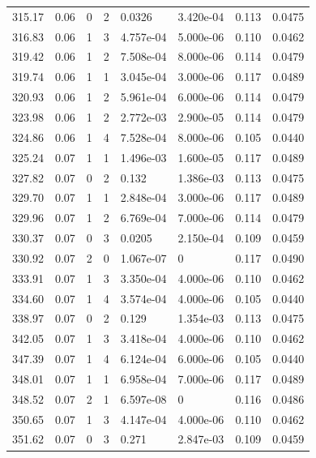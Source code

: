 \documentclass[preview]{standalone}
\begin{document}
{{{\begin{tabular}{L{1.2cm}C{1.2cm} C{0.3cm}C{0.5cm} C{1.4cm}C{1.4cm} C{1.4cm}C{1.4cm}}
  315.17  &  0.06  & 0     &  2 &  0.0326  & 3.420e-04  & 0.113 &  0.0475   \\ 
  316.83  &  0.06  & 1     &  3 &  4.757e-04  & 5.000e-06  & 0.110 &  0.0462   \\ 
  319.42  &  0.06  & 1     &  2 &  7.508e-04  & 8.000e-06  & 0.114 &  0.0479   \\ 
  319.74  &  0.06  & 1     &  1 &  3.045e-04  & 3.000e-06  & 0.117 &  0.0489   \\ 
  320.93  &  0.06  & 1     &  2 &  5.961e-04  & 6.000e-06  & 0.114 &  0.0479   \\ 
  323.98  &  0.06  & 1     &  2 &  2.772e-03  & 2.900e-05  & 0.114 &  0.0479   \\ 
  324.86  &  0.06  & 1     &  4 &  7.528e-04  & 8.000e-06  & 0.105 &  0.0440   \\ 
  325.24  &  0.07  & 1     &  1 &  1.496e-03  & 1.600e-05  & 0.117 &  0.0489   \\ 
  327.82  &  0.07  & 0     &  2 &  0.132  & 1.386e-03  & 0.113 &  0.0475   \\ 
  329.70  &  0.07  & 1     &  1 &  2.848e-04  & 3.000e-06  & 0.117 &  0.0489   \\ 
  329.96  &  0.07  & 1     &  2 &  6.769e-04  & 7.000e-06  & 0.114 &  0.0479   \\ 
  330.37  &  0.07  & 0     &  3 &  0.0205  & 2.150e-04  & 0.109 &  0.0459   \\ 
  330.92  &  0.07  & 2     &  0 &  1.067e-07  & 0  & 0.117 &  0.0490   \\ 
  333.91  &  0.07  & 1     &  3 &  3.350e-04  & 4.000e-06  & 0.110 &  0.0462   \\ 
  334.60  &  0.07  & 1     &  4 &  3.574e-04  & 4.000e-06  & 0.105 &  0.0440   \\ 
  338.97  &  0.07  & 0     &  2 &  0.129  & 1.354e-03  & 0.113 &  0.0475   \\ 
  342.05  &  0.07  & 1     &  3 &  3.418e-04  & 4.000e-06  & 0.110 &  0.0462   \\ 
  347.39  &  0.07  & 1     &  4 &  6.124e-04  & 6.000e-06  & 0.105 &  0.0440   \\ 
  348.01  &  0.07  & 1     &  1 &  6.958e-04  & 7.000e-06  & 0.117 &  0.0489   \\ 
  348.52  &  0.07  & 2     &  1 &  6.597e-08  & 0  & 0.116 &  0.0486   \\ 
  350.65  &  0.07  & 1     &  3 &  4.147e-04  & 4.000e-06  & 0.110 &  0.0462   \\ 
  351.62  &  0.07  & 0     &  3 &  0.271  & 2.847e-03  & 0.109 &  0.0459   \\ 

\end{tabular}}}}
\end{document}
